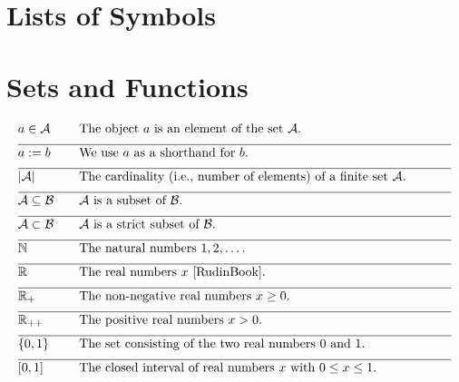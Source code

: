 
\section*{Lists of Symbols}

\vspace*{-2mm}
\section*{Sets and Functions} 

\begin{align} 
	&a \in \mathcal{A} & \quad & \parbox{.85\textwidth}{The object $a$ is an element of the set $\mathcal{A}$.} \nonumber \\[2mm] \hline \nonumber\\[-5mm]
	&a \defeq b & \quad & \mbox{We use $a$ as a shorthand for $b$. }\nonumber \\[2mm] \hline \nonumber\\[-5mm]
	&|\mathcal{A}| & \quad & \mbox{The cardinality (i.e., number of elements) of a finite set $\mathcal{A}$.}\nonumber \\[2mm] \hline \nonumber\\[-5mm]
	&\mathcal{A} \subseteq \mathcal{B}& \quad & \mbox{$\mathcal{A}$ is a subset of $\mathcal{B}$.}\nonumber \\[2mm] \hline \nonumber\\[-5mm]
	&\mathcal{A} \subset \mathcal{B}& \quad & \mbox{$\mathcal{A}$ is a strict subset of $\mathcal{B}$.} \nonumber \\[2mm] \hline \nonumber\\[-5mm]
	&\mathbb{N} & \quad & \mbox{The natural numbers $1, 2, \dots$.}\nonumber \\[2mm] \hline \nonumber\\[-5mm]
	&\mathbb{R}  &\quad &\mbox{The real numbers $x$ \cite{RudinBook}.} \nonumber \\[2mm] \hline \nonumber\\[-5mm]
	&\mathbb{R}_{+}  &\quad &\mbox{The non-negative real numbers $x\geq0$.}\nonumber \\[2mm] \hline \nonumber\\[-5mm]
	&\mathbb{R}_{++}  &\quad &\mbox{The positive real numbers $x> 0$.} \nonumber \\[2mm] \hline \nonumber\\[-5mm]
	&\{0,1\}& \quad & \mbox{The set consisting of the two real numbers $0$ and $1$.} \nonumber \\[2mm] \hline \nonumber\\[-5mm]
	&[0,1] &\quad &\mbox{The closed interval of real numbers $x$ with $0 \leq x \leq 1$. }\nonumber 
\end{align} 

